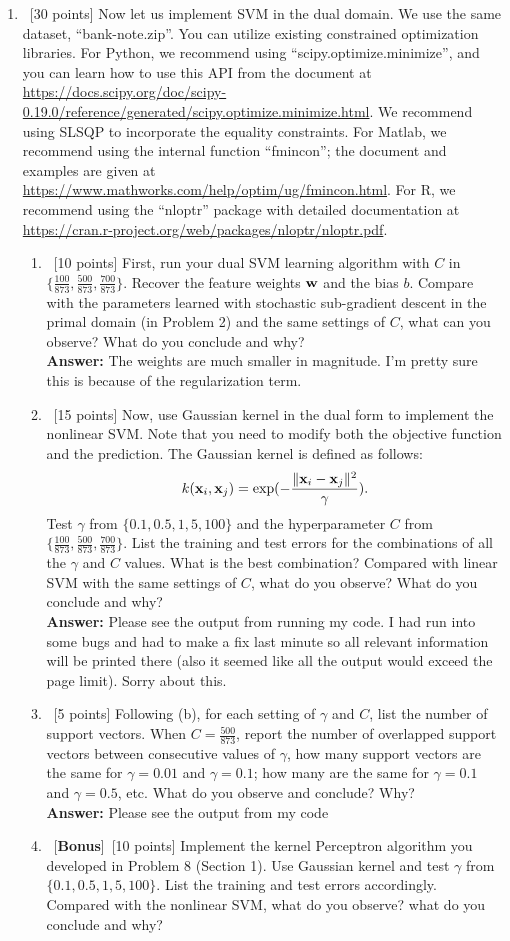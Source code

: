 \documentclass[12pt, fullpage,letterpaper]{article}
\newcommand{\Answer}{{\\\textbf{Answer: }}}
\begin{document}
\begin{enumerate}
\item~[30 points] Now let us implement SVM in the dual domain. We use the same dataset, ``bank-note.zip''. You can utilize existing constrained optimization libraries. For Python, we recommend using ``scipy.optimize.minimize'', and you can learn how to use this API from the document at \url{https://docs.scipy.org/doc/scipy-0.19.0/reference/generated/scipy.optimize.minimize.html}. We recommend using SLSQP to incorporate the equality constraints.
For Matlab, we recommend using the internal function ``fmincon''; the document and examples are given at \url{https://www.mathworks.com/help/optim/ug/fmincon.html}.  
For R, we recommend using the ``nloptr'' package with detailed documentation at \url{https://cran.r-project.org/web/packages/nloptr/nloptr.pdf}.

\begin{enumerate}
	\item ~[10 points] First, run your dual SVM learning algorithm with   $C$ in $\{\frac{100}{873}, \frac{500}{873}, \frac{700}{873}\}$. Recover the feature weights ${\bf w}$ and the bias $b$. Compare with the parameters learned with stochastic sub-gradient descent in the primal domain (in Problem 2) and the same settings of $C$, what can you observe? What do you conclude and why?
	\Answer The weights are much smaller in magnitude.  I'm pretty sure this is because of the regularization term.
	\item~[15 points] Now, use Gaussian kernel in the dual form to implement the nonlinear SVM. Note that you need to modify both the objective function and the prediction. The Gaussian kernel is defined as follows:
	\[
	k({\bf x}_i, {\bf x}_j) = \exp(-\frac{\|{\bf x}_i - {\bf x}_j\|^2}{\gamma}).
	\]
	Test $\gamma$ from $\{0.1, 0.5, 1,  5, 100\}$ and the hyperparameter $C$ from $\{ \frac{100}{873}, \frac{500}{873},  \frac{700}{873}\}$. List the training and test errors for the combinations of all the $\gamma$ and $C$ values. What is the best combination? Compared with linear SVM with the same settings of $C$, what do you observe? What do you conclude and why?  
	\Answer Please see the output from running my code.  I had run into some bugs and had to make a fix last minute so all relevant information will be printed there (also it seemed like all the output would exceed the page limit).  Sorry about this.
	\item~[5 points] Following (b), for each setting of $\gamma$ and $C$, list the number of support vectors. When $C = \frac{500}{873}$, report the number of overlapped support vectors between consecutive values of $\gamma$, \ie how many support vectors are the same for $\gamma= 0.01$ and $\gamma = 0.1$; how many are the same for  $\gamma = 0.1$ and $\gamma = 0.5$, etc. What do you observe and conclude? Why?
	\Answer Please see the output from my code
	\item~[\textbf{Bonus}]~[10 points] Implement the kernel Perceptron algorithm you developed in Problem 8 (Section 1). Use Gaussian kernel and test $\gamma$ from $\{ 0.1, 0.5, 1, 5, 100\}$. List the training and test errors accordingly. Compared with the nonlinear SVM, what do you observe? what do you conclude and why?
	

\end{enumerate}
\end{enumerate}
\end{document}
